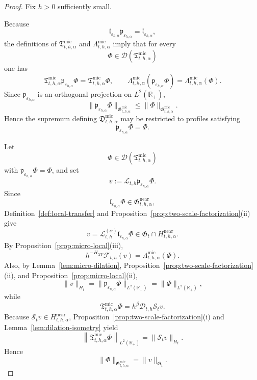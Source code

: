 \documentclass[11pt,a4paper]{amsart}
\theoremstyle{plain}
\theoremstyle{definition}
\theoremstyle{remark}
\newcommand{\R}{\mathbb{R}}
\begin{document}
\begin{proof}
Fix \(h>0\) sufficiently small.

Because
\[
\mathfrak l_{\varepsilon_{h,\alpha}}\mathfrak p_{\varepsilon_{h,\alpha}}
=
\mathfrak l_{\varepsilon_{h,\alpha}},
\]
the definitions of \(\mathfrak T_{t,h,\alpha}^{\mathrm{mic}}\) and
\(\Lambda_{t,h,\alpha}^{\mathrm{mic}}\) imply that for every
\[
\Phi\in\mathcal D(\mathfrak T_{t,h,\alpha}^{\mathrm{mic}})
\]
one has
\[
\mathfrak T_{t,h,\alpha}^{\mathrm{mic}}\mathfrak p_{\varepsilon_{h,\alpha}}\Phi
=
\mathfrak T_{t,h,\alpha}^{\mathrm{mic}}\Phi,
\qquad
\Lambda_{t,h,\alpha}^{\mathrm{mic}}(\mathfrak p_{\varepsilon_{h,\alpha}}\Phi)
=
\Lambda_{t,h,\alpha}^{\mathrm{mic}}(\Phi).
\]
Since \(\mathfrak p_{\varepsilon_{h,\alpha}}\) is an orthogonal projection on \(L^2(\R_+)\),
\[
\|\mathfrak p_{\varepsilon_{h,\alpha}}\Phi\|_{\mathfrak G_{t,h,\alpha}^{\mathrm{mic}}}
\le
\|\Phi\|_{\mathfrak G_{t,h,\alpha}^{\mathrm{mic}}}.
\]
Hence the supremum defining \(\mathfrak D_{t,h,\alpha}^{\mathrm{mic}}\) may be restricted to
profiles satisfying
\[
\mathfrak p_{\varepsilon_{h,\alpha}}\Phi=\Phi.
\]

Let
\[
\Phi\in \mathcal D(\mathfrak T_{t,h,\alpha}^{\mathrm{mic}})
\]
with \(\mathfrak p_{\varepsilon_{h,\alpha}}\Phi=\Phi\), and set
\[
v:=\mathcal L_{t,h}\mathfrak p_{\varepsilon_{h,\alpha}}\Phi.
\]
Since
\[
\mathfrak l_{\varepsilon_{h,\alpha}}\Phi\in \mathfrak G_{t,h,\alpha}^{\mathrm{near}},
\]
Definition~\ref{def:local-transfer} and Proposition~\ref{prop:two-scale-factorization}(ii) give
\[
v=\mathcal L_{t,h}^{(\alpha)}\mathfrak l_{\varepsilon_{h,\alpha}}\Phi
\in
\mathfrak G_t\cap H_{t,h,\alpha}^{\mathrm{near}}.
\]
By Proposition~\ref{prop:micro-local}(iii),
\begin{equation}\label{eq:micro-near-functional-forward}
h^{-H_{XY}}\mathcal F_{t,h}(v)=\Lambda_{t,h,\alpha}^{\mathrm{mic}}(\Phi).
\end{equation}
Also, by Lemma~\ref{lem:micro-dilation},
Proposition~\ref{prop:two-scale-factorization}(ii), and
Proposition~\ref{prop:micro-local}(ii),
\[
\|v\|_{H_t}
=
\|\mathfrak p_{\varepsilon_{h,\alpha}}\Phi\|_{L^2(\R_+)}
=
\|\Phi\|_{L^2(\R_+)},
\]
while
\[
\mathfrak T_{t,h,\alpha}^{\mathrm{mic}}\Phi
=
h^\beta \mathcal D_{t,h}\mathcal S_t v.
\]
Because \(\mathcal S_t v\in H_{t,h,\alpha}^{\mathrm{near}}\), Proposition~\ref{prop:two-scale-factorization}(i)
and Lemma~\ref{lem:dilation-isometry} yield
\[
\left\|
\mathfrak T_{t,h,\alpha}^{\mathrm{mic}}\Phi
\right\|_{L^2(\R_+)}
=
\|\mathcal S_t v\|_{H_t}.
\]
Hence
\begin{equation}\label{eq:micro-near-norm-forward}
\|\Phi\|_{\mathfrak G_{t,h,\alpha}^{\mathrm{mic}}}
=
\|v\|_{\mathfrak G_t}.
\end{equation}


\end{proof}
\end{document}
